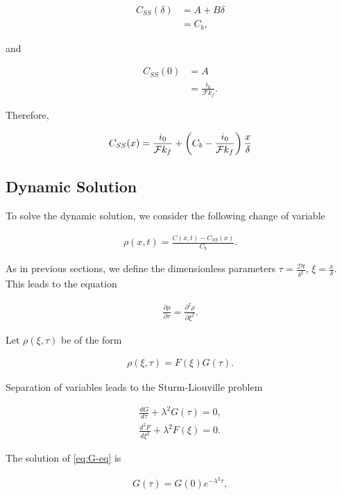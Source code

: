 \begin{align}
	C_{SS}(\delta) &= A + B\delta\\
	&= C_b,
\end{align}

and

\begin{align}
	C_{SS}(0) &= A \\
	&= \frac{i_0}{\mathcal{F} k_f}.
\end{align}

Therefore,

\begin{align}
	C_{SS} (x) = \frac{i_0}{\mathcal{F}k_f} +\left({C_b - \frac{i_0}{\mathcal{F}k_f}}\right)\frac{x}{\delta}
\end{align}

\subsection{Dynamic Solution}

To solve the dynamic solution, we consider the following change of variable

\begin{align}
	\rho(x, t) = \frac{C(x,t)-C_{SS}(x)}{C_b}.
\end{align}

As in previous sections, we define the dimensionless parameters $\tau = \frac{\mathcal{D} t}{\delta^2}$, $\xi = \frac{x}{\delta}$. This leads to the equation

\begin{align}
	\frac{\partial \rho}{\partial \tau} = \frac{\partial^2 \rho}{\partial \xi^2}.
\end{align}

Let $\rho(\xi, \tau)$ be of the form

\begin{align}
	\rho(\xi, \tau) = F(\xi)G(\tau).
\end{align}


Separation of variables leads to the Sturm-Liouville problem

\begin{align}
	\frac{d G}{d \tau} + \lambda^2G(\tau) = 0,
	\label{eq:G-eq}\\
	\frac{d^2 F}{d\xi^2} + \lambda^2 F(\xi) = 0.
	\label{eq:F-eq}
\end{align}


The solution of \ref{eq:G-eq} is 

\begin{align}
	G(\tau) = G(0) e^{-\lambda^2 \tau},
\end{align}

